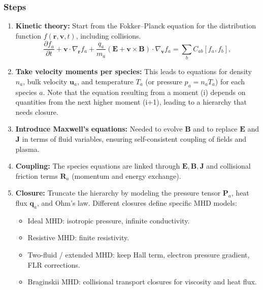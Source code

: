 \documentclass[10pt]{book}
\begin{document}
\subsubsection{Steps}
\begin{enumerate}
    \item \textbf{Kinetic theory:} Start from the Fokker--Planck equation for the distribution function $f(\mathbf{r},\mathbf{v},t)$, including collisions.
    \begin{equation}
        \frac{\partial f_a}{\partial t}
        + \mathbf{v} \cdot \nabla_{\mathbf{r}} f_a
        + \frac{q_a}{m_a} \left( \mathbf{E} + \mathbf{v} \times \mathbf{B} \right) \cdot \nabla_{\mathbf{v}} f_a
        = \sum_b C_{ab}[f_a, f_b],
    \end{equation}

    \item \textbf{Take velocity moments per species:} This leads to equations for density $n_a$, bulk velocity $\mathbf{u}_a$, and temperature $T_a$ (or pressure $p_a = n_a T_a$) for each species $a$.
    Note that the equation resulting from a moment (i) depends on quantities from the next higher moment (i+1), leading to a hierarchy that needs closure.

    \item \textbf{Introduce Maxwell’s equations:} Needed to evolve $\mathbf{B}$ and to replace $\mathbf{E}$ and $\mathbf{J}$ in terms of fluid variables, ensuring self-consistent coupling of fields and plasma.
    
    \item \textbf{Coupling:} The species equations are linked through $\mathbf{E}, \mathbf{B}, \mathbf{J}$ and collisional friction terms $\mathbf{R}_a$ (momentum and energy exchange).

    \item \textbf{Closure:} Truncate the hierarchy by modeling the pressure tensor $\mathbf{P}_a$, heat flux $\mathbf{q}_a$, and Ohm’s law. Different closures define specific MHD models:
    \begin{itemize}
        \item Ideal MHD: isotropic pressure, infinite conductivity.
        \item Resistive MHD: finite resistivity.
        \item Two-fluid / extended MHD: keep Hall term, electron pressure gradient, FLR corrections.
        \item Braginskii MHD: collisional transport closures for viscosity and heat flux.
    \end{itemize}
\end{enumerate}
\end{document}
